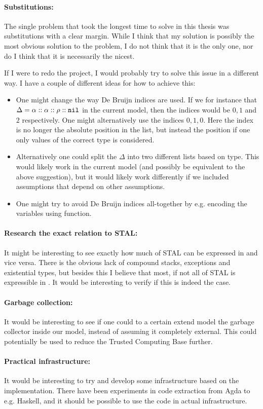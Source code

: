 \paragraph{Substitutions:}
The single problem that took the longest time to solve in this thesis was
substitutions with a clear margin. While I think that my solution is possibly
the most obvious solution to the problem, I do not think that it is the only
one, nor do I think that it is necessarily the nicest.

If I were to redo the project, I would probably try to solve this issue in a
different way. I have a couple of different ideas for how to achieve this:

\begin{itemize}
\item One might change the way De Bruijn indices are used. If we for instance
  that $\Delta = \alpha :: \alpha :: \rho :: \mathtt{nil}$ in the current model, then
  the indices would be $0, 1$ and $2$ respectively. One might alternatively use
  the indices $0, 1, 0$. Here the index is no longer the absolute position in
  the list, but instead the position if one only values of the correct type is
  considered.
\item Alternatively one could split the $\Delta$ into two different lists based
  on type. This would likely work in the current model (and possibly be
  equivalent to the above suggestion), but it would likely work differently if
  we included assumptions that depend on other assumptions.
\item One might try to avoid De Bruijn indices all-together by e.g. encoding the
  variables using function.
\end{itemize}

\paragraph{Research the exact relation to STAL:}
It might be interesting to see exactly how much of STAL can be expressed in
\ATAL and vice versa. There is the obvious lack of compound stacks, exceptions
and existential types, but besides this I believe that most, if not all of STAL
is expressible in \ATAL. It would be interesting to verify if this is indeed the
case.

\paragraph{Garbage collection:}
It would be interesting to see if one could to a certain extend model the
garbage collector inside our model, instead of assuming it completely
external. This could potentially be used to reduce the Trusted Computing Base
further.

\paragraph{Practical infrastructure:}
It would be interesting to try and develop some infrastructure based on the
implementation. There have been experiments in code extraction from Agda to
e.g. Haskell, and it should be possible to use the code in actual
infrastructure.
